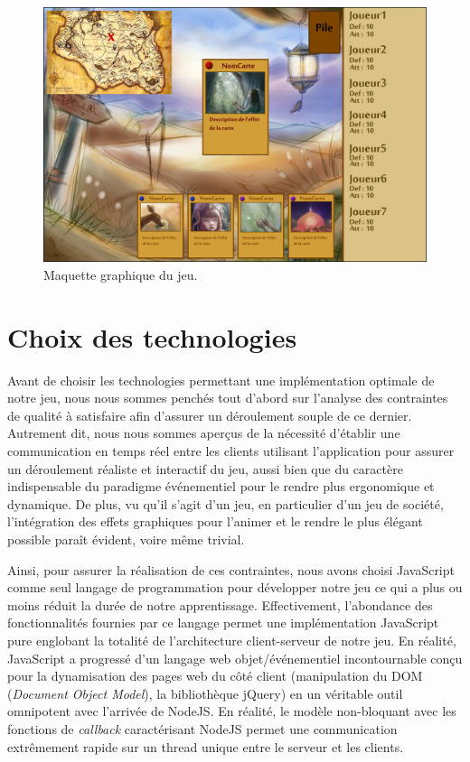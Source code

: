 \documentclass[12pt]{report}
\begin{document}
  \begin{figure}[h!]
  	\centering
    \includegraphics[scale=2.6]{images/mock-up.png}
    \caption{Maquette graphique du jeu.}
    \label{fig:maquette}
  \end{figure}

  \section{Choix des technologies}
	Avant de choisir les technologies permettant une implémentation optimale de notre jeu, nous nous sommes penchés tout d'abord sur l'analyse des contraintes de qualité à satisfaire afin d'assurer un déroulement souple de ce dernier. Autrement dit, nous nous sommes aperçus de la nécessité d'établir une communication en temps réel entre les clients utilisant l'application pour assurer un déroulement réaliste et interactif du jeu, aussi bien que du caractère indispensable du paradigme événementiel pour le rendre plus ergonomique et dynamique. De plus, vu qu'il s'agit d'un jeu, en particulier d'un jeu de société, l'intégration des effets graphiques pour l'animer et le rendre le plus élégant possible paraît évident, voire même trivial.

	Ainsi, pour assurer la réalisation de ces contraintes, nous avons choisi JavaScript comme seul langage de programmation pour développer notre jeu ce qui a plus ou moins réduit la durée de notre apprentissage. Effectivement, l'abondance des fonctionnalités fournies par ce langage permet une implémentation JavaScript pure englobant la totalité de l'architecture client-serveur de notre jeu. En réalité, JavaScript a progressé d'un langage web objet/événementiel incontournable conçu pour la dynamisation des pages web du côté client (manipulation du DOM (\textit{Document Object Model}), la bibliothèque jQuery) en un véritable outil omnipotent avec l'arrivée de NodeJS. En réalité, le modèle non-bloquant avec les fonctions de \textit{callback} caractérisant NodeJS permet une communication extrêmement rapide sur un thread unique entre le serveur et les clients.
\end{document}
